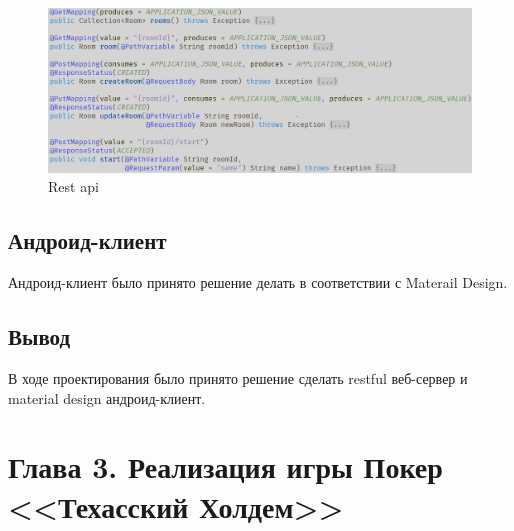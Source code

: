 ~

\begin{figure}[H]
	\begin{center}
		\includegraphics[scale=0.6]{pics/rest3}
	    \caption{Rest api} 
		\label{pic:rest:3}
	\end{center}
\end{figure}

\subsection*{Андроид-клиент}

Андроид-клиент было принято решение делать в соответствии с Materail Design.

\subsection*{Вывод}

В ходе проектирования было принято решение сделать restful веб-сервер и  material design андроид-клиент.

\section*{Глава 3. Реализация игры Покер <<Техасский Холдем>>}


